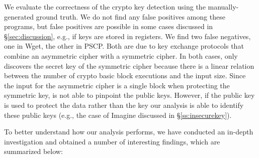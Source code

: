 We evaluate the correctness of the crypto key detection using the manually-generated ground truth. 
We do not find any false positives among these programs, but false positives are possible in some cases discussed in  \S\ref{sec:discussion}, 
e.g., if keys are stored in registers.
We find two false negatives, one in  \textsf{\small Wget}, the other in \textsf{\small PSCP}. Both are due to key exchange protocols that combine an asymmetric cipher with a symmetric cipher. 
In both cases, \sysname only discovers the secret key of the symmetric cipher because there is a linear relation between the number of crypto basic block executions and the input size. Since the input for the asymmetric cipher is a single block when protecting the symmetric key, \sysname is not able to pinpoint the public keys. However, if the public key is used to protect the data rather than the key %
our analysis is able to identify these public keys (e.g., the case of \textsf{\small Imagine} discussed in \S\ref{ss:insecurekey}). 
%

To better understand how our analysis performs, we have conducted an in-depth investigation and obtained a number of interesting findings, which are summarized below:%

